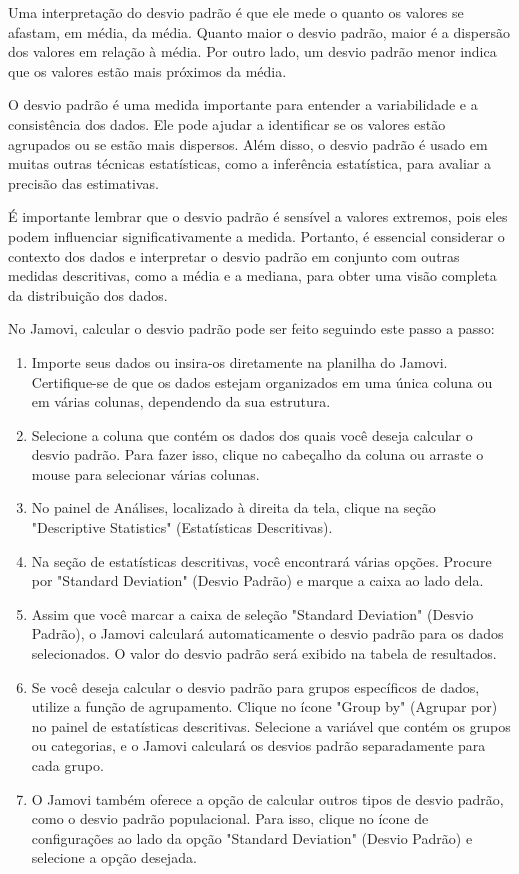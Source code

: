 Uma interpretação do desvio padrão é que ele mede o quanto os valores se afastam, em média, da média. Quanto maior o desvio padrão, maior é a dispersão dos valores em relação à média. Por outro lado, um desvio padrão menor indica que os valores estão mais próximos da média.

O desvio padrão é uma medida importante para entender a variabilidade e a consistência dos dados. Ele pode ajudar a identificar se os valores estão agrupados ou se estão mais dispersos. Além disso, o desvio padrão é usado em muitas outras técnicas estatísticas, como a inferência estatística, para avaliar a precisão das estimativas.

É importante lembrar que o desvio padrão é sensível a valores extremos, pois eles podem influenciar significativamente a medida. Portanto, é essencial considerar o contexto dos dados e interpretar o desvio padrão em conjunto com outras medidas descritivas, como a média e a mediana, para obter uma visão completa da distribuição dos dados.

No Jamovi, calcular o desvio padrão pode ser feito seguindo este passo a passo:

\begin{enumerate}
    \item Importe seus dados ou insira-os diretamente na planilha do Jamovi. Certifique-se de que os dados estejam organizados em uma única coluna ou em várias colunas, dependendo da sua estrutura.
    \item Selecione a coluna que contém os dados dos quais você deseja calcular o desvio padrão. Para fazer isso, clique no cabeçalho da coluna ou arraste o mouse para selecionar várias colunas.
    \item No painel de Análises, localizado à direita da tela, clique na seção "Descriptive Statistics" (Estatísticas Descritivas).
    \item Na seção de estatísticas descritivas, você encontrará várias opções. Procure por "Standard Deviation" (Desvio Padrão) e marque a caixa ao lado dela.
    \item Assim que você marcar a caixa de seleção "Standard Deviation" (Desvio Padrão), o Jamovi calculará automaticamente o desvio padrão para os dados selecionados. O valor do desvio padrão será exibido na tabela de resultados.
    \item Se você deseja calcular o desvio padrão para grupos específicos de dados, utilize a função de agrupamento. Clique no ícone "Group by" (Agrupar por) no painel de estatísticas descritivas. Selecione a variável que contém os grupos ou categorias, e o Jamovi calculará os desvios padrão separadamente para cada grupo.
    \item O Jamovi também oferece a opção de calcular outros tipos de desvio padrão, como o desvio padrão populacional. Para isso, clique no ícone de configurações ao lado da opção "Standard Deviation" (Desvio Padrão) e selecione a opção desejada.
\end{enumerate}